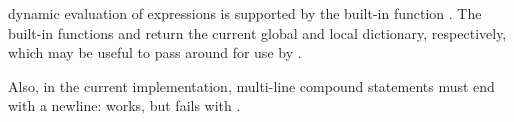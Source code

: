 dynamic evaluation of expressions is supported by the built-in
function .  The built-in functions
 and  return the current global
and local dictionary, respectively, which may be useful to pass around
for use by .

Also, in the current implementation, multi-line compound statements must
end with a newline:
 works, but
 fails with
.
  

